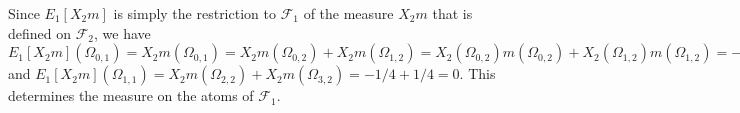 \documentclass[11pt,fleqn]{amsproc}
\newcommand{\F}{\mathcal{F}}
\begin{document}
Since $E_1[X_2m]$ is simply the restriction to $\F_1$ of the measure
$X_2m$ that is defined on $\F_2$, we have $E_1[X_2m](\Omega_{0,1})
= X_2m(\Omega_{0,1}) = X_2m(\Omega_{0,2}) + X_2m(\Omega_{1,2}) =
X_2(\Omega_{0,2})m(\Omega_{0,2}) + X_2(\Omega_{1,2})m(\Omega_{1,2}) =
-1(1/4) + 1(1/4) = 0$ and $E_1[X_2m](\Omega_{1,1}) = X_2m(\Omega_{2,2})
+ X_2m(\Omega_{3,2}) = -1/4 + 1/4 = 0$.  This determines the measure on
the atoms of $\F_1$.
\end{document}
